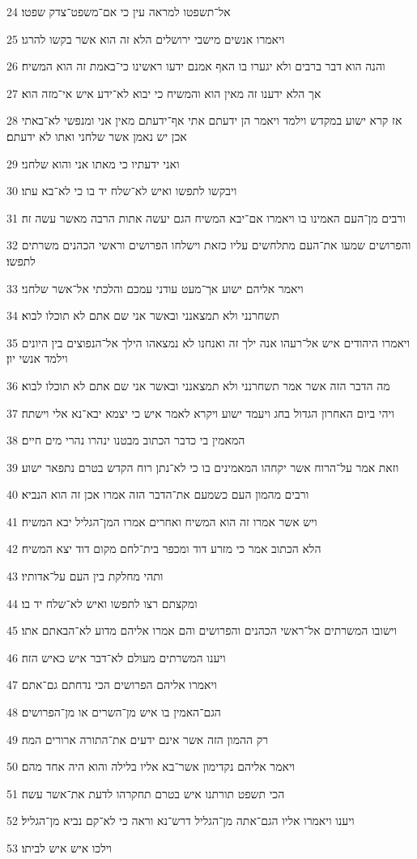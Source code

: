 \par 24 אל־תשפטו למראה עין כי אם־משפט־צדק שפטו׃
\par 25 ויאמרו אנשים מישבי ירושלים הלא זה הוא אשר בקשו להרגו׃
\par 26 והנה הוא דבר ברבים ולא יגערו בו האף אמנם ידעו ראשינו כי־באמת זה הוא המשיח׃
\par 27 אך הלא ידענו זה מאין הוא והמשיח כי יבוא לא־ידע איש אי־מזה הוא׃
\par 28 אז קרא ישוע במקדש וילמד ויאמר הן ידעתם אתי אף־ידעתם מאין אני ומנפשי לא־באתי אכן יש נאמן אשר שלחני ואתו לא ידעתם׃
\par 29 ואני ידעתיו כי מאתו אני והוא שלחני׃
\par 30 ויבקשו לתפשו ואיש לא־שלח יד בו כי לא־בא עתו׃
\par 31 ורבים מן־העם האמינו בו ויאמרו אם־יבא המשיח הגם יעשה אתות הרבה מאשר עשה זה׃
\par 32 והפרושים שמעו את־העם מתלחשים עליו כזאת וישלחו הפרושים וראשי הכהנים משרתים לתפשו׃
\par 33 ויאמר אליהם ישוע אך־מעט עודני עמכם והלכתי אל־אשר שלחני׃
\par 34 תשחרנני ולא תמצאנני ובאשר אני שם אתם לא תוכלו לבוא׃
\par 35 ויאמרו היהודים איש אל־רעהו אנה ילך זה ואנחנו לא נמצאהו הילך אל־הנפוצים בין היונים וילמד אנשי יון׃
\par 36 מה הדבר הזה אשר אמר תשחרנני ולא תמצאנני ובאשר אני שם אתם לא תוכלו לבוא׃
\par 37 ויהי ביום האחרון הגדול בחג ויעמד ישוע ויקרא לאמר איש כי יצמא יבא־נא אלי וישתה׃
\par 38 המאמין בי כדבר הכתוב מבטנו ינהרו נהרי מים חיים׃
\par 39 וזאת אמר על־הרוח אשר יקחהו המאמינים בו כי לא־נתן רוח הקדש בטרם נתפאר ישוע׃
\par 40 ורבים מהמון העם כשמעם את־הדבר הזה אמרו אכן זה הוא הנביא׃
\par 41 ויש אשר אמרו זה הוא המשיח ואחרים אמרו המן־הגליל יבא המשיח׃
\par 42 הלא הכתוב אמר כי מזרע דוד ומכפר בית־לחם מקום דוד יצא המשיח׃
\par 43 ותהי מחלקת בין העם על־אדותיו׃
\par 44 ומקצתם רצו לתפשו ואיש לא־שלח יד בו׃
\par 45 וישובו המשרתים אל־ראשי הכהנים והפרושים והם אמרו אליהם מדוע לא־הבאתם אתו׃
\par 46 ויענו המשרתים מעולם לא־דבר איש כאיש הזה׃
\par 47 ויאמרו אליהם הפרושים הכי נדחתם גם־אתם׃
\par 48 הגם־האמין בו איש מן־השרים או מן־הפרושים׃
\par 49 רק ההמון הזה אשר אינם ידעים את־התורה ארורים המה׃
\par 50 ויאמר אליהם נקדימון אשר־בא אליו בלילה והוא היה אחד מהם׃
\par 51 הכי תשפט תורתנו איש בטרם תחקרהו לדעת את־אשר עשה׃
\par 52 ויענו ויאמרו אליו הגם־אתה מן־הגליל דרש־נא וראה כי לא־קם נביא מן־הגליל׃
\par 53 וילכו איש איש לביתו׃

